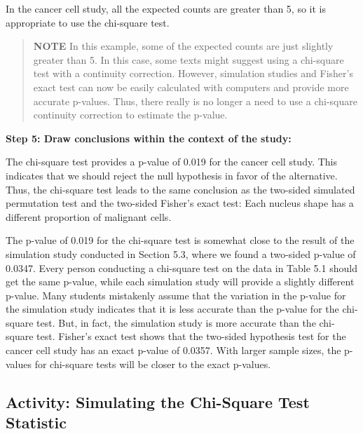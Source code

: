 \documentclass[
]{book}
\begin{document}
In the cancer cell study, all the expected counts are greater than 5, so it is appropriate to use the chi-square test.

\begin{quote}
\textbf{NOTE} In this example, some of the expected counts are just slightly greater than 5. In this case, some texts might suggest using a chi-square test with a continuity correction. However, simulation studies and Fisher's exact test can now be easily calculated with computers and provide more accurate p-values. Thus, there really is no longer a need to use a chi-square continuity correction to estimate the p-value.
\end{quote}

\textbf{Step 5: Draw conclusions within the context of the study:}

The chi-square test provides a p-value of 0.019 for the cancer cell study. This indicates that we should reject the null hypothesis in favor of the alternative. Thus, the chi-square test leads to the same conclusion as the two-sided simulated permutation test and the two-sided Fisher's exact test: Each nucleus shape has a different proportion of malignant cells.

The p-value of 0.019 for the chi-square test is somewhat close to the result of the simulation study conducted in Section 5.3, where we found a two-sided p-value of 0.0347. Every person conducting a chi-square test on the data in Table 5.1 should get the same p-value, while each simulation study will provide a slightly different p-value. Many students mistakenly assume that the variation in the p-value for the simulation study indicates that it is less accurate than the p-value for the chi-square test. But, in fact, the simulation study is more accurate than the chi-square test. Fisher's exact test shows that the two-sided hypothesis test for the cancer cell study has an exact p-value of 0.0357. With larger sample sizes, the p-values for chi-square tests will be closer to the exact p-values.

\hypertarget{activity-simulating-the-chi-square-test-statistic}{%
\subsection*{Activity: Simulating the Chi-Square Test Statistic}\label{activity-simulating-the-chi-square-test-statistic}}
\end{document}
